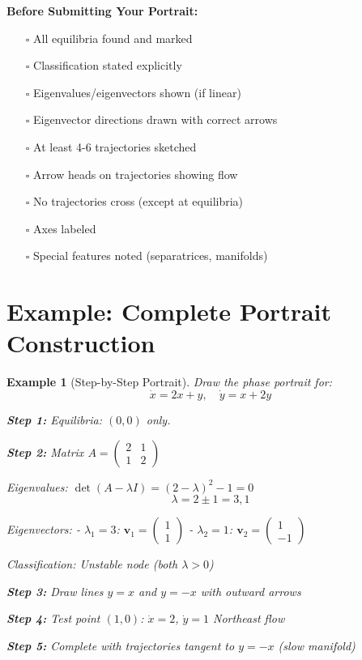 \documentclass[12pt]{article}
\newtheorem{example}{Example}
\begin{document}
\begin{examtip}
\textbf{Before Submitting Your Portrait:}
\begin{itemize}
    \item[$\square$] All equilibria found and marked
    \item[$\square$] Classification stated explicitly
    \item[$\square$] Eigenvalues/eigenvectors shown (if linear)
    \item[$\square$] Eigenvector directions drawn with correct arrows
    \item[$\square$] At least 4-6 trajectories sketched
    \item[$\square$] Arrow heads on trajectories showing flow
    \item[$\square$] No trajectories cross (except at equilibria)
    \item[$\square$] Axes labeled
    \item[$\square$] Special features noted (separatrices, manifolds)
\end{itemize}
\end{examtip}

\section{Example: Complete Portrait Construction}

\begin{example}[Step-by-Step Portrait]
Draw the phase portrait for:
$$\dot{x} = 2x + y, \quad \dot{y} = x + 2y$$

\textbf{Step 1:} Equilibria: $(0,0)$ only.

\textbf{Step 2:} Matrix $A = \begin{pmatrix} 2 & 1 \\ 1 & 2 \end{pmatrix}$

Eigenvalues: $\det(A - \lambda I) = (2-\lambda)^{2} - 1 = 0$
$$\lambda = 2 \pm 1 = 3, 1$$

Eigenvectors:
- $\lambda_{1} = 3$: $\mathbf{v}_{1} = \begin{pmatrix} 1 \\ 1 \end{pmatrix}$
- $\lambda_{2} = 1$: $\mathbf{v}_{2} = \begin{pmatrix} 1 \\ -1 \end{pmatrix}$

Classification: Unstable node (both $\lambda > 0$)

\textbf{Step 3:} Draw lines $y = x$ and $y = -x$ with outward arrows

\textbf{Step 4:} Test point $(1, 0)$: $\dot{x} = 2$, $\dot{y} = 1$ \rightarrow Northeast flow

\textbf{Step 5:} Complete with trajectories tangent to $y = -x$ (slow manifold)
\end{example}
\end{document}
